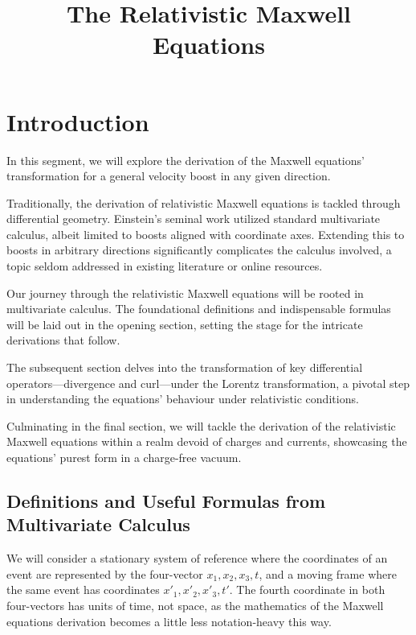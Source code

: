 \documentclass[12pt]{article}
\title{The Relativistic Maxwell Equations}
\author{}
\date{}
\begin{document}
\maketitle


\section{Introduction}

In this segment, we will explore the derivation of the Maxwell equations' transformation for
a general velocity boost in any given direction.

Traditionally, the derivation of relativistic Maxwell equations is tackled through
differential geometry. Einstein's seminal work utilized standard multivariate calculus, albeit
limited to boosts aligned with coordinate axes. Extending this to boosts in arbitrary
directions significantly complicates the calculus involved, a topic seldom addressed in
existing literature or online resources.

Our journey through the relativistic Maxwell equations will be rooted in multivariate
calculus. The foundational definitions and indispensable formulas will be laid out in the
opening section, setting the stage for the intricate derivations that follow.

The subsequent section delves into the transformation of key differential operators---divergence
and curl---under the Lorentz transformation, a pivotal step in understanding the equations'
behaviour under relativistic conditions.

Culminating in the final section, we will tackle the derivation of the relativistic Maxwell
equations within a realm devoid of charges and currents, showcasing the equations' purest
form in a charge-free vacuum.

\subsection{Definitions and Useful Formulas from Multivariate Calculus}

We will consider a stationary system of reference where the coordinates of an event are
represented by the four-vector $x_1, x_2, x_3, t$, and a moving frame where the same event
has coordinates $x'_1, x'_2, x'_3, t'$. The fourth coordinate in both four-vectors has units
of time, not space, as the mathematics of the Maxwell equations derivation becomes a little
less notation-heavy this way.
\end{document}
